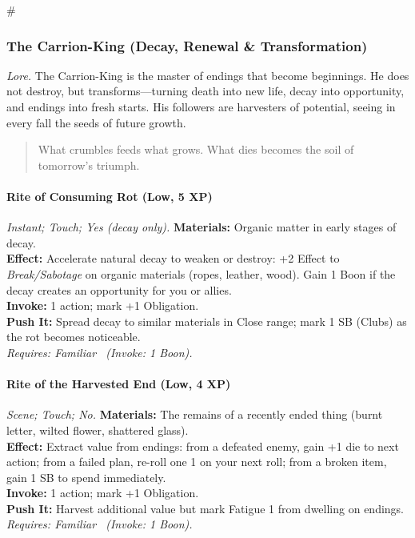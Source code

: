 # %

\subsubsection{The Carrion-King (Decay, Renewal \& Transformation)}
\textit{Lore.} The Carrion-King is the master of endings that become beginnings. He does not destroy, but transforms—turning death into new life, decay into opportunity, and endings into fresh starts. His followers are harvesters of potential, seeing in every fall the seeds of future growth.

\begin{quote}
What crumbles feeds what grows. What dies becomes the soil of tomorrow's triumph.
\end{quote}

\paragraph*{Rite of Consuming Rot (Low, 5 XP)} \emph{Instant; Touch; Yes (decay only).}
\textbf{Materials:} Organic matter in early stages of decay. \\
\textbf{Effect:} Accelerate natural decay to weaken or destroy: +2 Effect to \emph{Break/Sabotage} on organic materials (ropes, leather, wood). Gain 1 Boon if the decay creates an opportunity for you or allies. \\
\textbf{Invoke:} 1 action; mark +1 Obligation. \\
\textbf{Push It:} Spread decay to similar materials in Close range; mark 1 SB (Clubs) as the rot becomes noticeable. \\
\emph{Requires: Familiar \ (\textit{Invoke:} 1 Boon).}

\paragraph*{Rite of the Harvested End (Low, 4 XP)} \emph{Scene; Touch; No.}
\textbf{Materials:} The remains of a recently ended thing (burnt letter, wilted flower, shattered glass). \\
\textbf{Effect:} Extract value from endings: from a defeated enemy, gain +1 die to next action; from a failed plan, re-roll one 1 on your next roll; from a broken item, gain 1 SB to spend immediately. \\
\textbf{Invoke:} 1 action; mark +1 Obligation. \\
\textbf{Push It:} Harvest additional value but mark Fatigue 1 from dwelling on endings. \\
\emph{Requires: Familiar \ (\textit{Invoke:} 1 Boon).}

